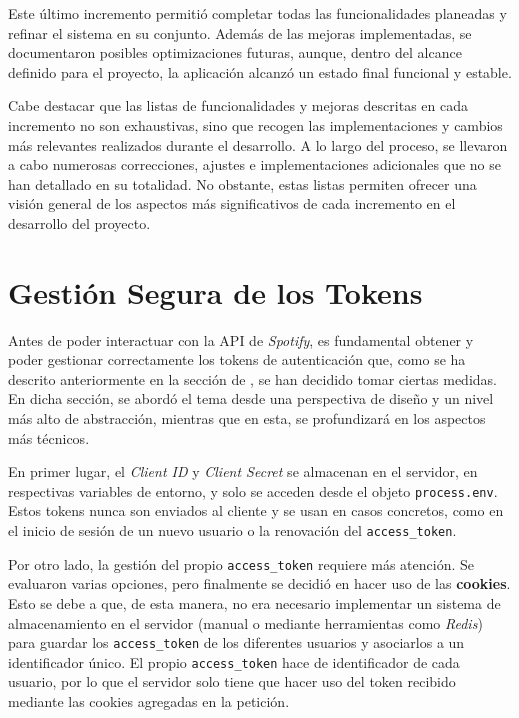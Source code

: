 Este último incremento permitió completar todas las funcionalidades planeadas y refinar el sistema en su conjunto. Además de las mejoras implementadas, se documentaron posibles optimizaciones futuras, aunque, dentro del alcance definido para el proyecto, la aplicación alcanzó un estado final funcional y estable.

Cabe destacar que las listas de funcionalidades y mejoras descritas en cada incremento no son exhaustivas, sino que recogen las implementaciones y cambios más relevantes realizados durante el desarrollo. A lo largo del proceso, se llevaron a cabo numerosas correcciones, ajustes e implementaciones adicionales que no se han detallado en su totalidad. No obstante, estas listas permiten ofrecer una visión general de los aspectos más significativos de cada incremento en el desarrollo del proyecto.

\section{Gestión Segura de los Tokens}

Antes de poder interactuar con la API de \textit{Spotify}, es fundamental obtener y poder gestionar correctamente los tokens de autenticación que, como se ha descrito anteriormente en la sección de , se han decidido tomar ciertas medidas. En dicha sección, se abordó el tema desde una perspectiva de diseño y un nivel más alto de abstracción, mientras que en esta, se profundizará en los aspectos más técnicos.

En primer lugar, el \textit{Client ID} y \textit{Client Secret} se almacenan en el servidor, en respectivas variables de entorno, y solo se acceden desde el objeto \texttt{process.env}. Estos tokens nunca son enviados al cliente y se usan en casos concretos, como en el inicio de sesión de un nuevo usuario o la renovación del \texttt{access\_token}.

Por otro lado, la gestión del propio \texttt{access\_token} requiere más atención. Se evaluaron varias opciones, pero finalmente se decidió en hacer uso de las \textbf{cookies}. Esto se debe a que, de esta manera, no era necesario implementar un sistema de almacenamiento en el servidor (manual o mediante herramientas como \textit{Redis}) para guardar los \texttt{access\_token} de los diferentes usuarios y asociarlos a un identificador único. El propio \texttt{access\_token} hace de identificador de cada usuario, por lo que el servidor solo tiene que hacer uso del token recibido mediante las cookies agregadas en la petición.

